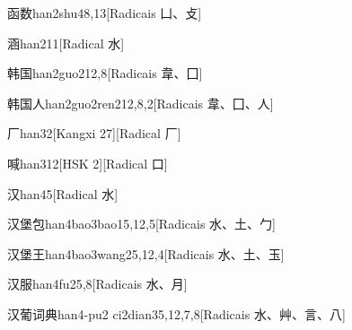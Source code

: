 \begin{entry}{函数}{han2shu4}{8,13}[Radicais ⼐、⽁]
\end{entry}

\begin{entry}{涵}{han2}{11}[Radical ⽔]
\end{entry}

\begin{entry}{韩国}{han2guo2}{12,8}[Radicais ⾱、⼞]
\end{entry}

\begin{entry}{韩国人}{han2guo2ren2}{12,8,2}[Radicais ⾱、⼞、⼈]
\end{entry}

\begin{entry}{厂}{han3}{2}[Kangxi 27][Radical ⼚]
\end{entry}

\begin{entry}{喊}{han3}{12}[HSK 2][Radical ⼝]
\end{entry}

\begin{entry}{汉}{han4}{5}[Radical ⽔]
\end{entry}

\begin{entry}{汉堡包}{han4bao3bao1}{5,12,5}[Radicais ⽔、⼟、⼓]
\end{entry}

\begin{entry}{汉堡王}{han4bao3wang2}{5,12,4}[Radicais ⽔、⼟、⽟]
\end{entry}

\begin{entry}{汉服}{han4fu2}{5,8}[Radicais ⽔、⽉]
\end{entry}

\begin{entry}{汉葡词典}{han4-pu2 ci2dian3}{5,12,7,8}[Radicais ⽔、⾋、⾔、⼋]
\end{entry}

